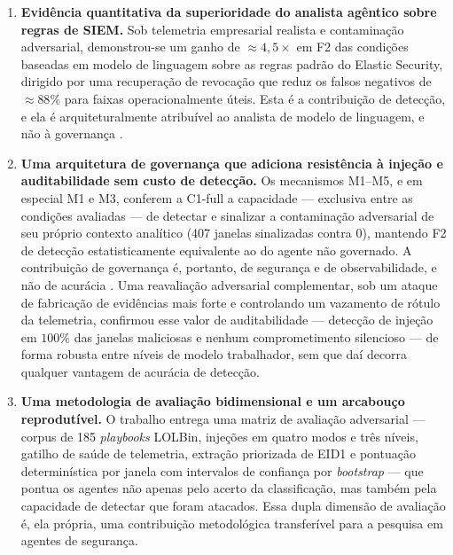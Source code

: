 \begin{enumerate}
    \item \textbf{Evidência quantitativa da superioridade do analista agêntico
    sobre regras de SIEM.} Sob telemetria empresarial realista e contaminação
    adversarial, demonstrou-se um ganho de $\approx 4{,}5\times$ em F2 das
    condições baseadas em modelo de linguagem sobre as regras padrão do Elastic
    Security, dirigido por uma recuperação de revocação que reduz os falsos
    negativos de $\approx 88\%$ para faixas operacionalmente úteis. Esta é a
    contribuição de detecção, e ela é arquiteturalmente atribuível ao analista de
    modelo de linguagem, e não à governança \cite{ali2023huntgptintegratingmachinelearningbased}.
    \item \textbf{Uma arquitetura de governança que adiciona resistência à injeção
    e auditabilidade sem custo de detecção.} Os mecanismos M1--M5, e em especial
    M1 e M3, conferem a C1-full a capacidade --- exclusiva entre as condições
    avaliadas --- de detectar e sinalizar a contaminação adversarial de seu
    próprio contexto analítico (407 janelas sinalizadas contra 0), mantendo F2 de
    detecção estatisticamente equivalente ao do agente não governado. A
    contribuição de governança é, portanto, de segurança e de observabilidade, e
    não de acurácia \cite{zhan2024injecagent, NEURIPS2024_eb113910, huang2024resilience}.
    Uma reavaliação adversarial complementar, sob um ataque de fabricação de
    evidências mais forte e controlando um vazamento de rótulo da telemetria,
    confirmou esse valor de auditabilidade --- detecção de injeção em $100\%$ das
    janelas maliciosas e nenhum comprometimento silencioso --- de forma robusta
    entre níveis de modelo trabalhador, sem que daí decorra qualquer vantagem de
    acurácia de detecção.
    \item \textbf{Uma metodologia de avaliação bidimensional e um arcabouço
    reprodutível.} O trabalho entrega uma matriz de avaliação adversarial
    --- corpus de 185 \textit{playbooks} LOLBin, injeções em quatro modos e três
    níveis, gatilho de saúde de telemetria, extração priorizada de EID1 e
    pontuação determinística por janela com intervalos de confiança por
    \textit{bootstrap} --- que pontua os agentes não apenas pelo acerto da
    classificação, mas também pela capacidade de detectar que foram atacados. Essa
    dupla dimensão de avaliação é, ela própria, uma contribuição metodológica
    transferível para a pesquisa em agentes de segurança.
\end{enumerate}

